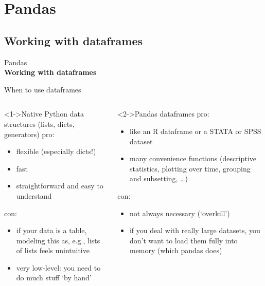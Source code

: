 \documentclass{beamer}
\begin{document}
\section{Pandas}
\subsection{Working with dataframes}

\begin{frame}[plain]
	Pandas\\
	\textbf{Working with dataframes}
\end{frame}




\begin{frame}{When to use dataframes}
	\footnotesize
	\begin{columns}[t]
		
		\begin{block}<1->{Native Python data structures (lists, dicts, generators)}
		pro:
		\begin{itemize}
			\item flexible (especially dicts!)
			\item fast
			\item straightforward and easy to understand
		\end{itemize}
		con:
		\begin{itemize}
			\item if your data is a table, modeling this as, e.g., lists of lists feels unintuitive
			\item very low-level: you need to do much stuff `by hand'
		\end{itemize}
		
		\end{block}
		
		
		\begin{block}<2->{Pandas dataframes}
			pro:
			\begin{itemize}
				\item like an R dataframe or a STATA or SPSS dataset
				\item many convenience functions (descriptive statistics, plotting over time, grouping and subsetting, \ldots)
			\end{itemize}
			con:
			\begin{itemize}
				\item not always necessary (`overkill')
				\item if you deal with really large datasets, you don't want to load them fully into memory (which pandas does)
			\end{itemize}
			
		\end{block}
		
	\end{columns}
	
\end{frame}
\end{document}
